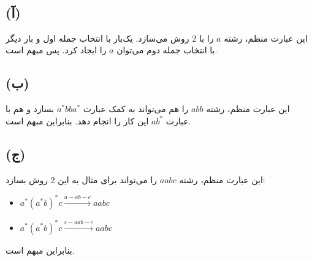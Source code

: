 \\[0.1in]
\subsection*{(آ)}
این عبارت منظم، رشته $a$ را با 2 روش می‌سازد. یک‌بار با انتخاب جمله اول و بار دیگر با انتخاب جمله دوم می‌توان $a$ را ایجاد کرد. پس مبهم است.

\subsection*{(ب)}
این عبارت منظم، رشته $abb$ را هم می‌تواند به کمک عبارت 
$a^*bba^*$ بسازد و هم با عبارت 
$ab^*$ این کار را انجام دهد. بنابراین مبهم است.

\subsection*{(ج)}
این عبارت منظم، رشته $aabc$ را می‌تواند برای مثال به این 2 روش بسازد:
\begin{itemize}
    \item $a^*(a^*b)^*c \xrightarrow[]{a - ab - c} aabc$
    \item $a^*(a^*b)^*c \xrightarrow[]{\epsilon-aab-c} aabc$
\end{itemize}
بنابراین مبهم است.\\